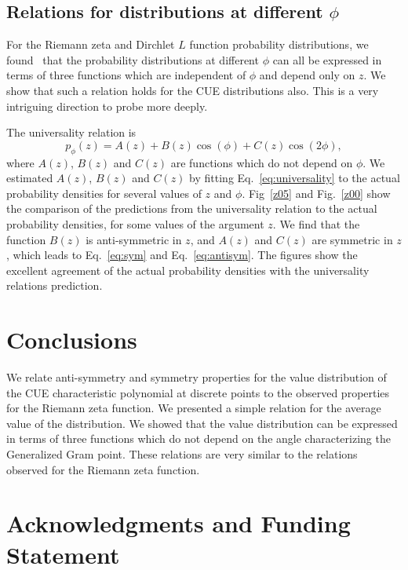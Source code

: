 \documentclass[twoside]{article}
\begin{document}
\subsection{\label{relation}Relations for distributions at different $\phi$}



For the Riemann zeta and Dirchlet $L$ function probability distributions, we found~\cite{Shanker 2022, Shanker 2020}
that the probability distributions at different $\phi$ can all be expressed in
terms of three functions which are independent of $\phi$ and depend only on $z$.
We show that such a relation holds for the CUE distributions also.
This is a very intriguing direction to probe more deeply.

The universality relation is
\begin{equation}
p_{\phi}(z) = A(z) + B(z)\cos(\phi) +C(z)\cos(2\phi),
\label{eq:universality}
\end{equation}
where $A(z)$, $B(z)$ and $C(z)$ are  functions which do not depend on $\phi$. 
We estimated $A(z)$, $B(z)$ and $C(z)$ by fitting Eq.~\ref{eq:universality} to the actual
probability densities for several values of $z$ and $\phi$. 
Fig~\ref{z05} and Fig.~\ref{z00} show the comparison of the predictions 
from the universality 
relation to the actual probability densities, for some values of the argument $z$.
We find that the function 
$B(z)$ is anti-symmetric in $z$, and $A(z)$ and $C(z)$ are symmetric in $z$, which 
leads to Eq.~\ref{eq:sym} and Eq.~\ref{eq:antisym}.
The figures show the excellent agreement of the actual probability densities with the
universality relations prediction.


\section{\label{conclusions}Conclusions}

We relate  anti-symmetry and symmetry properties 
for the value distribution of the CUE characteristic polynomial at discrete points
to the observed properties for the Riemann zeta function. 
We presented a simple relation for the average value 
of the  distribution. We showed that the value distribution 
can be expressed in terms of three  functions 
 which do not depend on the angle characterizing the Generalized Gram point. 
These relations are very similar to the relations observed for 
the Riemann zeta function.

\section*{Acknowledgments and Funding Statement}
\end{document}
